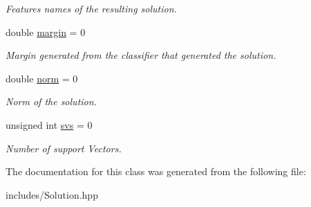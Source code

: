 \begin{DoxyCompactItemize}
\begin{DoxyCompactList}\small\item\em Features names of the resulting solution. \end{DoxyCompactList}\item 
\mbox{\label{class_solution_a3580af26a22d86e44df701f654165e0f}} 
double \hyperlink{class_solution_a3580af26a22d86e44df701f654165e0f}{margin} = 0
\begin{DoxyCompactList}\small\item\em Margin generated from the classifier that generated the solution. \end{DoxyCompactList}\item 
\mbox{\label{class_solution_acbc0610c1c2e2d7bb5c39af33b7eb99c}} 
double \hyperlink{class_solution_acbc0610c1c2e2d7bb5c39af33b7eb99c}{norm} = 0
\begin{DoxyCompactList}\small\item\em Norm of the solution. \end{DoxyCompactList}\item 
\mbox{\label{class_solution_ae9f64bc0520b7c42d3c395f48748eca5}} 
unsigned int \hyperlink{class_solution_ae9f64bc0520b7c42d3c395f48748eca5}{svs} = 0
\begin{DoxyCompactList}\small\item\em Number of support Vectors. \end{DoxyCompactList}\end{DoxyCompactItemize}


The documentation for this class was generated from the following file\+:\begin{DoxyCompactItemize}
\item 
includes/Solution.\+hpp\end{DoxyCompactItemize}
